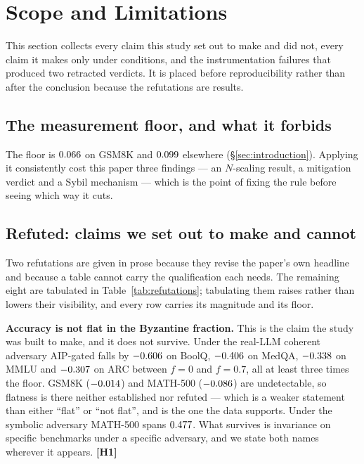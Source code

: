 \section{Scope and Limitations}
\label{sec:limitations}

This section collects every claim this study set out to make and did not, every
claim it makes only under conditions, and the instrumentation failures that
produced two retracted verdicts. It is placed before reproducibility rather than
after the conclusion because the refutations are results.

\subsection{The measurement floor, and what it forbids}

The floor is $0.066$ on GSM8K and $0.099$ elsewhere
(\S\ref{sec:introduction}). Applying it consistently cost this paper three
findings --- an $N$-scaling result, a mitigation verdict and a Sybil mechanism ---
which is the point of fixing the rule before seeing which way it cuts.

\subsection{Refuted: claims we set out to make and cannot}

Two refutations are given in prose because they revise the paper's own headline
and because a table cannot carry the qualification each needs. The remaining
eight are tabulated in Table~\ref{tab:refutations}; tabulating them raises rather
than lowers their visibility, and every row carries its magnitude and its floor.

\textbf{Accuracy is not flat in the Byzantine fraction.} This is the claim the
study was built to make, and it does not survive. Under the real-LLM coherent
adversary AIP-gated falls by $-0.606$ on BoolQ, $-0.406$ on
MedQA, $-0.338$ on MMLU and $-0.307$ on ARC between $f=0$ and
$f=0.7$, all at least three times the floor. GSM8K ($-0.014$) and
MATH-500 ($-0.086$) are undetectable, so flatness is there neither
established nor refuted --- which is a weaker statement than either ``flat'' or
``not flat'', and is the one the data supports. Under the symbolic adversary
MATH-500 spans $0.477$. What survives is invariance on specific
benchmarks under a specific adversary, and we state both names wherever it
appears. \textbf{[H1]}

